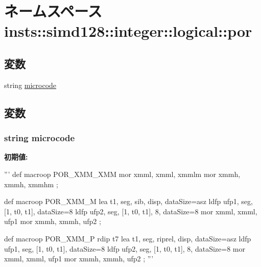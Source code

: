 \hypertarget{namespaceinsts_1_1simd128_1_1integer_1_1logical_1_1por}{
\section{ネームスペース insts::simd128::integer::logical::por}
\label{namespaceinsts_1_1simd128_1_1integer_1_1logical_1_1por}
}
\subsection*{変数}
\begin{DoxyCompactItemize}
\item 
string \hyperlink{namespaceinsts_1_1simd128_1_1integer_1_1logical_1_1por_a770f11a173e99389a8802f0107ed8f52}{microcode}
\end{DoxyCompactItemize}


\subsection{変数}
\hypertarget{namespaceinsts_1_1simd128_1_1integer_1_1logical_1_1por_a770f11a173e99389a8802f0107ed8f52}{
\subsubsection[{microcode}]{\setlength{\rightskip}{0pt plus 5cm}string {\bf microcode}}}
\label{namespaceinsts_1_1simd128_1_1integer_1_1logical_1_1por_a770f11a173e99389a8802f0107ed8f52}
{\bfseries 初期値:}
\begin{DoxyCode}
'''
def macroop POR_XMM_XMM {
    mor xmml, xmml, xmmlm
    mor xmmh, xmmh, xmmhm
};

def macroop POR_XMM_M {
    lea t1, seg, sib, disp, dataSize=asz
    ldfp ufp1, seg, [1, t0, t1], dataSize=8
    ldfp ufp2, seg, [1, t0, t1], 8, dataSize=8
    mor xmml, xmml, ufp1
    mor xmmh, xmmh, ufp2
};

def macroop POR_XMM_P {
    rdip t7
    lea t1, seg, riprel, disp, dataSize=asz
    ldfp ufp1, seg, [1, t0, t1], dataSize=8
    ldfp ufp2, seg, [1, t0, t1], 8, dataSize=8
    mor xmml, xmml, ufp1
    mor xmmh, xmmh, ufp2
};
'''
\end{DoxyCode}
